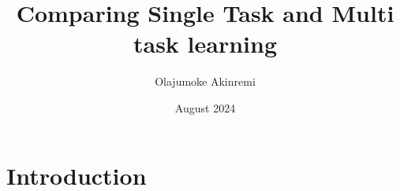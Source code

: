 \documentclass{article}
\title{Comparing Single Task and Multi task learning}
\author{Olajumoke Akinremi }
\date{August 2024}
\begin{document}
\maketitle

\section{Introduction}
\end{document}
